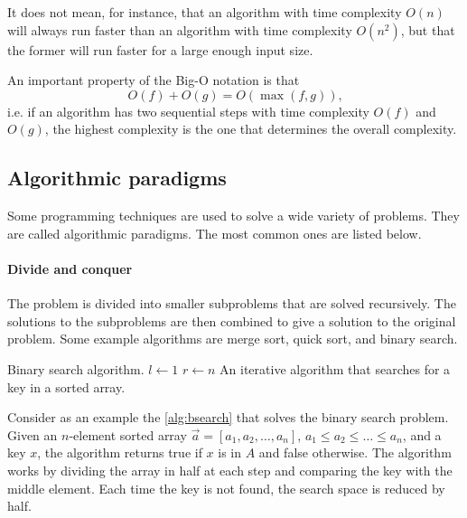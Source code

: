 It does not mean, for instance, that an algorithm with time complexity $O(n)$ will always run
faster than an algorithm with time complexity $O(n^2)$, but that the former will run faster
for a large enough input size.

An important property of the Big-O notation is that
\[
  O(f) + O(g) = O(\max(f, g))\text{,}
\]
i.e. if an algorithm has two sequential steps with time complexity $O(f)$ and $O(g)$, the
highest complexity is the one that determines the overall complexity.

\subsection{Algorithmic paradigms}

Some programming techniques are used to solve a wide variety of problems.  They are called
algorithmic paradigms.  The most common ones are listed below.

\paragraph{Divide and conquer}  The problem is divided into smaller subproblems that are
solved recursively.  The solutions to the subproblems are then combined to give a solution
to the original problem.  Some example algorithms are merge sort, quick sort, and binary
search.

\begin{algobox}[label=alg:bsearch]{Binary search algorithm.}
  $l \gets 1$\;
  $r \gets n$\;
  \tcblower
  An iterative algorithm that searches for a key in a sorted array.
\end{algobox}

Consider as an example the \cref{alg:bsearch} that solves the binary search problem.  Given an
$n$-element sorted array $\vec{a} = \left[a_1, a_2, \dots, a_n\right]$, $a_1 \leq a_2 \leq
\dots \leq a_n$, and a key $x$, the algorithm returns true if $x$ is in $A$ and false
otherwise.  The algorithm works by dividing the array in half at each step and comparing
the key with the middle element.  Each time the key is not found, the search space is
reduced by half.

